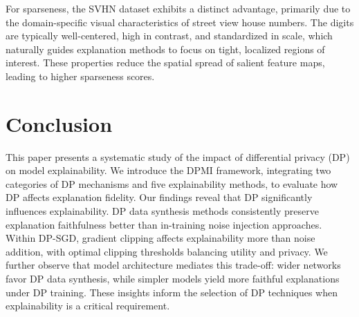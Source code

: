 \documentclass{article}
\begin{document}

For sparseness, the SVHN dataset exhibits a distinct advantage, primarily due to the domain-specific visual characteristics of street view house numbers. The digits are typically well-centered, high in contrast, and standardized in scale, which naturally guides explanation methods to focus on tight, localized regions of interest. These properties reduce the spatial spread of salient feature maps, leading to higher sparseness scores. 



\section{Conclusion} \label{sec:conclusion_limitation}
This paper presents a systematic study of the impact of differential privacy (DP) on model explainability. We introduce the DPMI framework, integrating two categories of DP mechanisms and five explainability methods, to evaluate how DP affects explanation fidelity. Our findings reveal that DP significantly influences explainability. DP data synthesis methods consistently preserve explanation faithfulness better than in-training noise injection approaches. Within DP-SGD, gradient clipping affects explainability more than noise addition, with optimal clipping thresholds balancing utility and privacy. We further observe that model architecture mediates this trade-off: wider networks favor DP data synthesis, while simpler models yield more faithful explanations under DP training. These insights inform the selection of DP techniques when explainability is a critical requirement.



\end{document}
